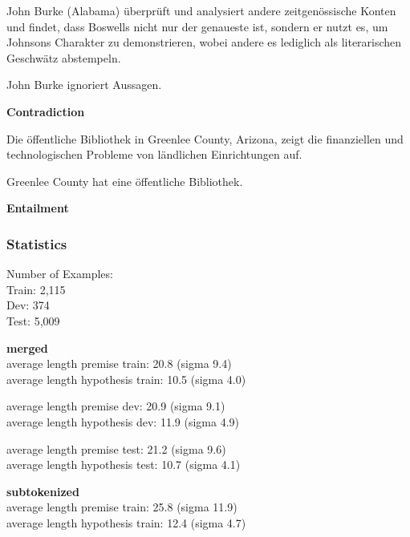 \begin{examples}
\item John Burke (Alabama) überprüft und analysiert andere zeitgenössische Konten und findet, dass Boswells nicht nur der genaueste ist, sondern er nutzt es, um Johnsons Charakter zu demonstrieren, wobei andere es lediglich als literarischen Geschwätz abstempeln.

        John Burke ignoriert Aussagen.

  \textbf{Contradiction}
\end{examples}

\begin{examples}
  \item Die öffentliche Bibliothek in Greenlee County, Arizona, zeigt die finanziellen und technologischen Probleme von ländlichen Einrichtungen auf.

        Greenlee County hat eine öffentliche Bibliothek.

  \textbf{Entailment}
\end{examples}



\subsubsection{Statistics}

Number of Examples: \\
Train: 2,115 \\
Dev: 374 \\
Test: 5,009

\textbf{merged} \\
average length premise train: 20.8 (sigma 9.4) \\
average length hypothesis train: 10.5 (sigma 4.0)

average length premise dev: 20.9 (sigma 9.1) \\
average length hypothesis dev: 11.9 (sigma 4.9)

average length premise test: 21.2 (sigma 9.6) \\
average length hypothesis test: 10.7 (sigma 4.1)


\textbf{subtokenized} \\
average length premise train: 25.8 (sigma 11.9) \\
average length hypothesis train: 12.4 (sigma 4.7)

